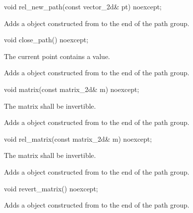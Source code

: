 %
\begin{itemdecl}
void rel_new_path(const vector_2d& pt) noexcept;
\end{itemdecl}
\begin{itemdescr}
\pnum
\effects
Adds a  object constructed from  to the end of the path group.
\end{itemdescr}

%
\begin{itemdecl}
void close_path() noexcept;
\end{itemdecl}
\begin{itemdescr}
\pnum
\requires
The current point contains a value.

\pnum
\effects
Adds a  object constructed from  to the end of the path group.
\end{itemdescr}

%
\begin{itemdecl}
void matrix(const matrix_2d& m) noexcept;
\end{itemdecl}
\begin{itemdescr}
\pnum
\requires
The matrix  shall be invertible.

\pnum
\effects
Adds a  object constructed from  to the end of the path group.
\end{itemdescr}

%
\begin{itemdecl}
void rel_matrix(const matrix_2d& m) noexcept;
\end{itemdecl}
\begin{itemdescr}
\pnum
\requires
The matrix  shall be invertible.

\pnum
\effects
Adds a  object constructed from  to the end of the path group.
\end{itemdescr}

%
\begin{itemdecl}
void revert_matrix() noexcept;
\end{itemdecl}
\begin{itemdescr}
\pnum
\effects
Adds a  object constructed from  to the end of the path group.
\end{itemdescr}

